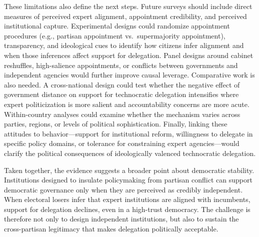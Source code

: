 \documentclass[11pt]{article}\usepackage[]{graphicx}\usepackage[]{xcolor}
\begin{document}
These limitations also define the next steps. Future surveys should include direct measures of perceived expert alignment, appointment credibility, and perceived institutional capture. Experimental designs could randomize appointment procedures (e.g., partisan appointment vs.\ supermajority appointment), transparency, and ideological cues to identify how citizens infer alignment and when those inferences affect support for delegation. Panel designs around cabinet reshuffles, high-salience appointments, or conflicts between governments and independent agencies would further improve causal leverage. Comparative work is also needed. A cross-national design could test whether the negative effect of government distance on support for technocratic delegation intensifies where expert politicization is more salient and accountability concerns are more acute. Within-country analyses could examine whether the mechanism varies across parties, regions, or levels of political sophistication. Finally, linking these attitudes to behavior---support for institutional reform, willingness to delegate in specific policy domains, or tolerance for constraining expert agencies---would clarify the political consequences of ideologically valenced technocratic delegation.

Taken together, the evidence suggests a broader point about democratic stability. Institutions designed to insulate policymaking from partisan conflict can support democratic governance only when they are perceived as credibly independent. When electoral losers infer that expert institutions are aligned with incumbents, support for delegation declines, even in a high-trust democracy. The challenge is therefore not only to design independent institutions, but also to sustain the cross-partisan legitimacy that makes delegation politically acceptable.


\FloatBarrier
\newpage



\clearpage
\newpage
{}
\setcounter{page}{1}
\printbibliography
\clearpage
\newpage



\clearpage



\begin{center}
\dotfill
{} \dotfill
\dotfill
{}
\end{center}
\end{document}
